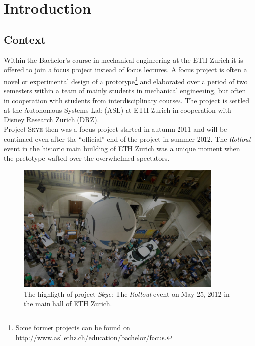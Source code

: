 \chapter{Introduction}\label{sec:introduction}
\graphicspath{{graphics/}{graphics/systems/}}


\section{Context}
\label{sec:context}

Within the Bachelor's course in mechanical engineering at the ETH Zurich it is offered to join a focus project instead of focus lectures. A focus project is often a novel or experimental design of a prototype\footnote{Some former projects can be found on \url{http://www.asl.ethz.ch/education/bachelor/focus}.} and elaborated over a period of two semesters within a team of mainly students in mechanical engineering, but often in cooperation with students from interdisciplinary courses. The project is settled at the Autonomous Systems Lab (ASL) at ETH Zurich in cooperation with Disney Research Zurich (DRZ). \\
Project \textsc{Skye} then was a focus project started in autumn \num{2011} and will be continued even after the ``official'' end of the project in summer 2012. The \textit{Rollout} event in the historic main building of ETH Zurich was a unique moment when the prototype wafted over the overwhelmed spectators. \\

\begin{figure}[H]
	\centering
    \includegraphics[width = 0.9\textwidth]{graphics/rollout2.jpg}
  \caption{The highligth of project \textit{Skye}: The \textit{Rollout} event on May 25, 2012 in the main hall of ETH Zurich.}
  \label{fig:rollout}
\end{figure}


